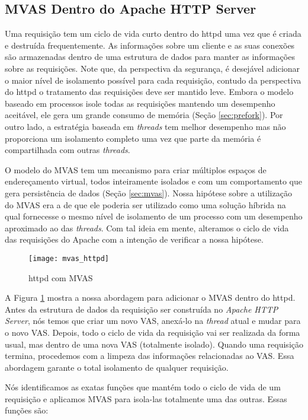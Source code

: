 \subsection{MVAS Dentro do Apache HTTP Server}

Uma requisição tem um ciclo de vida curto dentro do httpd uma vez que é criada
e destruída frequentemente. As informações sobre um cliente e as suas conexões
são armazenadas dentro de uma estrutura de dados para manter as informações
sobre as requisições. Note que, da perspectiva da segurança, é desejável
adicionar o maior nível de isolamento possível para cada requisição, contudo da
perspectiva do httpd o tratamento das requisições deve ser mantido leve. Embora
o modelo baseado em processos isole todas as requisições mantendo um desempenho
aceitável, ele gera um grande consumo de memória (Seção \ref{sec:prefork}).
Por outro lado, a estratégia baseada em \emph{threads} tem melhor desempenho mas
não proporciona um isolamento completo uma vez que parte da memória é
compartilhada com outras \emph{threads}.

O modelo do MVAS tem um mecanismo para criar múltiplos espaços de endereçamento
virtual, todos inteiramente isolados e com um comportamento que gera
persistência de dados (Seção \ref{sec:mvas}). Nossa hipótese sobre a utilização
do MVAS era a de que ele poderia ser utilizado como uma solução híbrida na
qual fornecesse o mesmo nível de isolamento de um processo com um desempenho
aproximado ao das \emph{threads}. Com tal ideia em mente, alteramos o ciclo
de vida das requisições do Apache com a intenção de verificar a nossa hipótese.

\begin{figure}[!h]
  \centering
  \texttt{[image: mvas\_httpd]}
  
  \caption{httpd com MVAS}
  \label{fig:httpd_mvas}
\end{figure}

A Figura \ref{fig:httpd_mvas} mostra a nossa abordagem para adicionar o MVAS
dentro do httpd. Antes da estrutura de dados da requisição ser construída no
\emph{Apache HTTP Server}, nós temos que criar um novo VAS, anexá-lo na \emph{thread}
atual e mudar para o novo VAS. Depois, todo o ciclo de vida da requisição vai
ser realizada da forma usual, mas dentro de uma nova VAS (totalmente isolado).
Quando uma requisição termina, procedemos com a limpeza das informações
relacionadas ao VAS. Essa abordagem garante o total isolamento de qualquer
requisição.

Nós identificamos as exatas funções que mantém todo o ciclo de vida de um
requisição e aplicamos MVAS para isola-las totalmente uma das outras.
Essas funções são:

